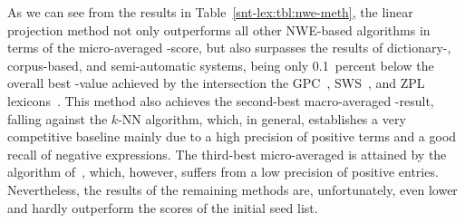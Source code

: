 As we can see from the results in Table~\ref{snt-lex:tbl:nwe-meth},
the linear projection method not only outperforms all other NWE-based
algorithms in terms of the micro-averaged \F-score, but also surpasses
the results of dictionary-, corpus-based, and semi-automatic systems,
being only 0.1~percent below the overall best \F-value achieved by the
intersection the GPC~\cite{Waltinger:10}, SWS~\cite{Remus:10}, and ZPL
lexicons~\cite{Clematide:10}.  This method also achieves the
second-best macro-averaged \F-result, falling against the $k$-NN
algorithm, which, in general, establishes a very competitive baseline
mainly due to a high precision of positive terms and a good recall of
negative expressions.  The third-best micro-averaged \F{} is attained
by the algorithm of~\citet{Tang:14a}, which, however, suffers from a
low precision of positive entries.  Nevertheless, the results of the
remaining methods are, unfortunately, even lower and hardly outperform
the scores of the initial seed list.

